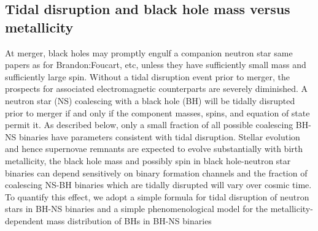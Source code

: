 \documentclass[nofootinbib,twocolumn,prd]{emulateapj}
\newcommand\editremark[1]{{\color{red}#1}}
\begin{document}
\subsection{Tidal disruption and black hole mass versus metallicity}
At merger, black holes may promptly engulf a companion neutron star \editremark{same papers as for Brandon:Foucart,
  etc}, unless they have sufficiently small mass and sufficiently large spin.  Without  a tidal disruption event prior to merger, the prospects for associated electromagnetic counterparts
are severely diminished.  
%
A neutron star  (NS) coalescing with a black hole (BH) will be tidally disrupted prior to merger if and only if the component
masses, spins, and equation of state permit it.  As described below, only a small fraction of all  possible coalescing
BH-NS binaries have parameters consistent with tidal disruption.  
%
Stellar evolution and hence supernovae remnants are expected to evolve
substantially with birth metallicity, the black hole mass and possibly spin in black hole-neutron star binaries can depend sensitively on binary formation
channels and the fraction of coalescing NS-BH binaries which are tidally disrupted will vary
over cosmic time. 
%
To quantify this effect, we adopt a simple formula for tidal disruption of neutron stars in BH-NS binaries and a simple
phenomenological model for the metallicity-dependent mass distribution of BHs in BH-NS binaries
\end{document}
